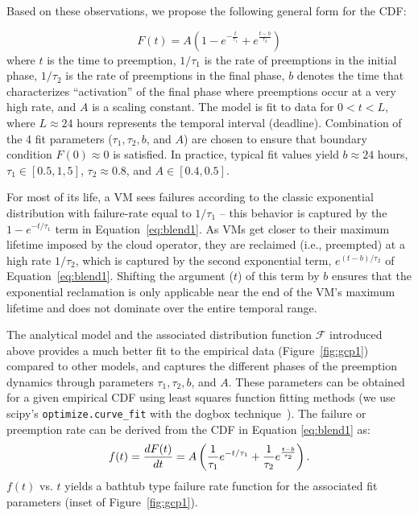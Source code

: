 \documentclass[compsoc]{IEEEtran}
\newcommand{\subsecspace}[0]{-0.20cm}
\newcommand{\eqnspace}[0]{-0.1cm}
\begin{document}
Based on these observations, we propose the following general form for the CDF:

\vspace*{\subsecspace}
\begin{equation}
  \label{eq:blend1}
  \boxed{
  F\left(t\right) = A\left(1-e^{-\frac{t}{\tau_1}} + e^{\frac{t-b}{\tau_2}}\right)}
  \end{equation}
\noindent where $t$ is the time to preemption, $1/\tau_1$ is the rate of preemptions in the initial phase, $1/\tau_2$ is the rate of preemptions in the final phase, $b$ denotes the time that characterizes ``activation'' of the final phase where preemptions occur at a very high rate, and $A$ is a scaling constant. 
The model is fit to data for $0 < t < L$, where $L \approx 24$ hours represents the temporal interval (deadline).
Combination of the 4 fit parameters ($\tau_1, \tau_2, b$, and $A$) are chosen to ensure that boundary condition $F(0) \approx 0$ is satisfied.
In practice, typical fit values yield $b \approx 24$ hours, $\tau_1 \in [0.5, 1,5] $, $\tau_2 \approx 0.8$, and $A \in [0.4, 0.5]$.






For most of its life, a VM sees failures according to the classic exponential distribution with failure-rate equal to $1/\tau_1$ -- this behavior is captured by the $1-e^{-t/\tau_1}$ term in Equation~\ref{eq:blend1}. 
As VMs get closer to their maximum lifetime imposed by the cloud operator, they are reclaimed (i.e., preempted) at a high rate $1/\tau_2$, which is captured by the second exponential term, $e^{(t-b)/\tau_2}$ of Equation~\ref{eq:blend1}. 
Shifting the argument ($t$) of this term by $b$ ensures that the exponential reclamation is only applicable near the end of the VM's maximum lifetime and does not dominate over the entire temporal range. 


The analytical model and the associated  distribution function $\mathscr{F}$ introduced above provides a much better fit to the empirical data (Figure~\ref{fig:gcp1}) compared to other models, and captures the different phases of the preemption dynamics through parameters $\tau_1, \tau_2, b$, and $A$. These parameters can be obtained for a given empirical CDF using least squares function fitting methods (we use scipy's \texttt{optimize.curve\_fit} with the dogbox technique~\cite{scipy-fit}). The failure or preemption rate can be derived from the CDF in Equation \ref{eq:blend1} as:
\begin{equation}
  \label{eq:failrate}
    \vspace*{\eqnspace}
f(t) = \dfrac{d F(t)} {dt} = A \left(\dfrac{1}{\tau_1}e^{-t/\tau_1} + \dfrac{1}{\tau_2}e^{\frac{t-b}{\tau_2}}\right).
\end{equation}
$f(t)$ vs. $t$ yields a bathtub type failure rate function for the associated fit parameters (inset of Figure~\ref{fig:gcp1}).
\end{document}
